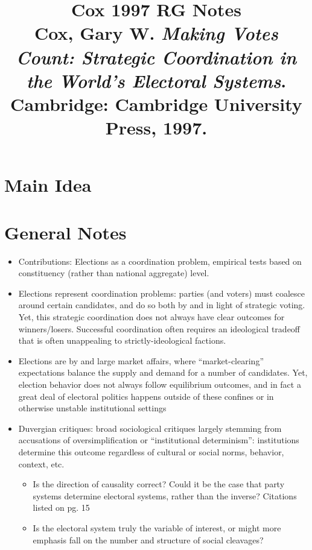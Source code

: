 \documentclass[12pt]{article}
\title{\textbf{Cox 1997 RG Notes}\\
\large Cox, Gary W. \textit{Making Votes Count: Strategic Coordination in the World's Electoral Systems}.\\
Cambridge: Cambridge University Press, 1997.}
\author{}
\date{}
\begin{document}
\maketitle

\section{Main Idea}



\section{General Notes}

\begin{itemize}[leftmargin=*, itemsep=4pt]
    \item Contributions: Elections as a coordination problem, empirical tests based on constituency (rather than national aggregate) level.
    \item Elections represent coordination problems: parties (and voters) must coalesce around certain candidates, and do so both by and in light of strategic voting. Yet, this strategic coordination does not always have clear outcomes for winners/losers. Successful coordination often requires an ideological tradeoff that is often unappealing to strictly-ideological factions.
    \item Elections are by and large market affairs, where ``market-clearing'' expectations balance the supply and demand for a number of candidates. Yet, election behavior does not always follow equilibrium outcomes, and in fact a great deal of electoral politics happens outside of these confines or in otherwise unstable institutional settings
    \item Duvergian critiques: broad sociological critiques largely stemming from accusations of oversimplification or ``institutional determinism'': institutions determine this outcome regardless of cultural or social norms, behavior, context, etc.
    \begin{itemize}
        \item Is the direction of causality correct? Could it be the case that party systems determine electoral systems, rather than the inverse? Citations listed on pg. 15
        \item Is the electoral system truly the variable of interest, or might more emphasis fall on the number and structure of social cleavages?

\end{itemize}
\end{itemize}
\end{document}
